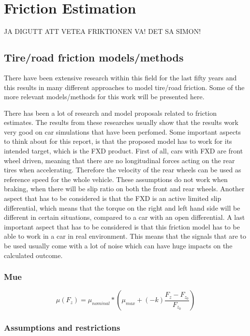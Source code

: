 \chapter{Friction Estimation}

JA DIGUTT ATT VETEA FRIKTIONEN VA! DET SA SIMON!



\section{Tire/road friction models/methods}

There have been extensive research within this field for the last fifty years and this results in many different approaches to model tire/road friction. Some of the more relevant models/methods for this work will be presented here.

There has been a lot of research and model proposals related to friction estimates. The results from these researches usually show that the results work very good on car simulations that have been perfomed. Some important aspects to think about for this report, is that the proposed model has to work for its intended target, which is the FXD product. First of all, cars with FXD are front wheel driven, meaning that there are no longitudinal forces acting on the rear tires when accelerating. Therefore the velocity of the rear wheels can be used as reference speed for the whole vehicle. These assumptions do not work when braking, when there will be slip ratio on both the front and rear wheels. Another aspect that has to be considered is that the FXD is an active limited slip differential, which means that the torque on the right and left hand side will be different in certain situations, compared to a car with an open differential. A last important aspect that has to be considered is that this friction model has to be able to work in a car in real environment. This means that the signals that are to be used usually come with a lot of noise which can have huge impacts on the calculated outcome.

\subsection{Mue}

\begin{equation}
\mu(F_{z})=\mu_{nominal}*(\mu_{max} + (-k)\frac{F_{z} - F_{z_{0}}}{F_{z_{0}}})
\end{equation}

\subsection{Assumptions and restrictions}



